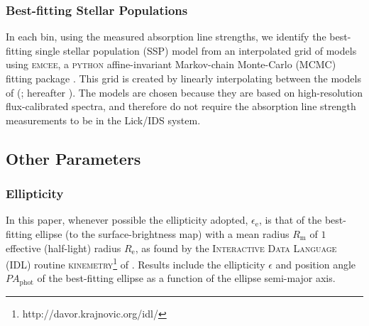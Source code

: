 \documentclass[a4paper,fleqn,usenatbib]{mnras}
\begin{document}
\subsubsection{Best-fitting Stellar Populations}
\label{subsubsec:stellarPop}

In each bin, using the measured absorption line strengths, we identify
the best-fitting single stellar population (SSP) model from an
interpolated grid of models using \textsc{emcee}, a \textsc{python}
affine-invariant Markov-chain Monte-Carlo (MCMC) fitting package
\citep{Foreman-Mackey2013}. This grid is created by linearly
interpolating between the models of \citeauthor{Thomas2010}
(\citeyear{Thomas2010}; hereafter ). The
 models are chosen because they are based on
high-resolution flux-calibrated spectra, and therefore do not require
the absorption line strength measurements to be in the Lick/IDS
system.

\subsection{Other Parameters}
\label{subsec:OtherParameters}

\subsubsection{Ellipticity}
\label{subsubsec:ellip}

In this paper, whenever possible the ellipticity adopted,
$\epsilon_\text{e}$, is that of the best-fitting ellipse (to the
surface-brightness map) with a mean radius $R_\text{m}$ of $1$
effective (half-light) radius $R_\text{e}$,
as found by the \textsc{Interactive Data Language (IDL)} routine
\textsc{kinemetry}\footnote{http://davor.krajnovic.org/idl/} of
\citet{Krajnovic2006}.
Results include the ellipticity $\epsilon$ and position angle
$PA_\text{phot}$ of the best-fitting ellipse as a function of the
ellipse semi-major axis.
\end{document}
